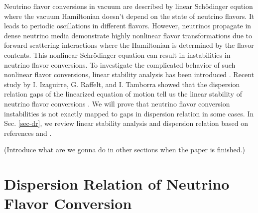 \documentclass[%
preprint,
 amsmath,amssymb,
 aps,
 prd
]{revtex4-1}
\begin{document}
Neutrino flavor conversions in vacuum are described by linear Sch\"{o}dinger eqution where the vacuum Hamiltonian doesn't depend on the state of neutrino flavors. It leads to periodic oscillations in different flavors. However, neutrinos propagate in dense neutrino media demonstrate highly nonlinear flavor transformations due to forward scattering interactions where the Hamiltonian is determined by the flavor contents. This nonlinear Schr\"{o}dinger equation can result in instabilities in neutrino flavor conversions. To investigate the complicated behavior of such nonlinear flavor conversions, linear stability analysis has been introduced \cite{Banerjee2011a,Raffelt2013}. Recent study by I. Izaguirre, G. Raffelt, and I. Tamborra showed that the dispersion relation gaps of the linearized equation of motion tell us the linear stability of neutrino flavor conversions \cite{Izaguirre2016a}. We will prove that neutrino flavor conversion instabilities is not exactly mapped to gaps in dispersion relation in some cases. In Sec. \ref{sec-dr}, we review linear stability analysis and dispersion relation based on references  and .

(Introduce what are we gonna do in other sections when the paper is finished.)



\section{\label{sec-dr}Dispersion Relation of Neutrino Flavor Conversion}
\end{document}
